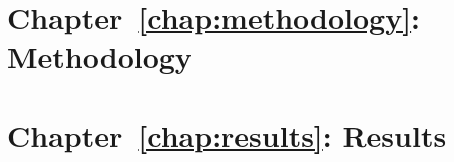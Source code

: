 \begin{description}
	\item [\parbox{1cm}{$E[\theta_{k}]$}]
	\item [\parbox{1cm}{$h_{i,k}$}]
	\item [\parbox{1cm}{$h_{i}$}]
	\item [\parbox{1cm}{$h_{k}$}]
	\item [\parbox{1cm}{$i$}]
	\item [\parbox{1cm}{$I$}]
	\item [\parbox{1cm}{$j$}]
	\item [\parbox{1cm}{$J$}]
	\item [\parbox{1cm}{$K-1$}]
	\item [\parbox{1cm}{$k$}]
	\item [\parbox{1cm}{$K$}]
	\item [\parbox{1cm}{$L$}]
	\item [\parbox{1cm}{$LSE$}]
	\item [\parbox{1cm}{$Mult$}]
	\item [\parbox{1cm}{$N_{0,k}$}]
	\item [\parbox{1cm}{$N_{1,k}$}]
	\item [\parbox{1cm}{$N_{j,k}$}]
	\item [\parbox{1cm}{$N_{j}$}]
	\item [\parbox{1cm}{$N_{k}$}]
	\item [\parbox{1cm}{$N$}]
	\item [\parbox{1cm}{$S$}]
	\item [\parbox{1cm}{$t$}]
\end{description}

\section{Chapter~\ref{chap:methodology}: Methodology}
\label{sec:symbols:methodology}

\begin{description}
	\item [\parbox{1cm}{$\alpha$}]
	\item [\parbox{1cm}{$\eta$}]
	\item [\parbox{1cm}{$\mathbb{R}$}]
	\item [\parbox{1cm}{$v_{ij}$}]
	\item [\parbox{1cm}{$x_{ij}$}]

\end{description}

\section{Chapter~\ref{chap:results}: Results}
\label{sec:symbols:results}

